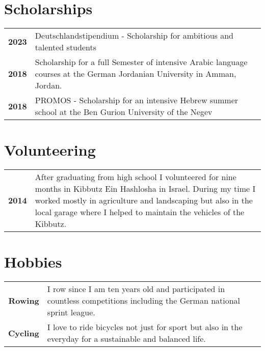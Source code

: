 \documentclass{style/modernsimplecv}
\newlength{\rightcolwidth}
\newlength{\leftcolwidth}
\begin{document}
\begin{paracol}{2}
\begin{minipage}[t]{\rightcolwidth}
    \end{minipage}

    \bigskip

    \begin{minipage}[t]{\leftcolwidth}
        \section*{Scholarships}
        \begin{tabular}{>{\small\bfseries}r >{\small}p{}}
            2023 & Deutschlandstipendium -  Scholarship for ambitious and talented students                                                  \\
            2018 & Scholarship for a full Semester of intensive Arabic language courses at the German Jordanian University in Amman, Jordan. \\
            2018 & PROMOS -  Scholarship for an intensive Hebrew summer school at the Ben Gurion University of the Negev                     \\
        \end{tabular}
        \bigskip

    \end{minipage}\hfill

    \bigskip

    \begin{minipage}[t]{\rightcolwidth}
        \section*{Volunteering}
        \begin{tabular}{>{\small\bfseries}r >{\small}p{}}
            2014 & After graduating from high school I volunteered for nine months in Kibbutz Ein Hashlosha in Israel. During my time I worked mostly in agriculture and landscaping but also in the local garage where I helped to maintain the vehicles of the Kibbutz. \\
        \end{tabular}
        \bigskip

        \section*{Hobbies}
        \begin{tabular}{>{\small\bfseries}r >{\small}p{}}
            Rowing  & I row since I am ten years old and participated in countless competitions including the German national sprint league. \\
            Cycling & I love to ride bicycles not just for sport but also in the everyday for a sustainable and balanced life.
        \end{tabular}
    \end{minipage}









\end{paracol}
\end{document}
